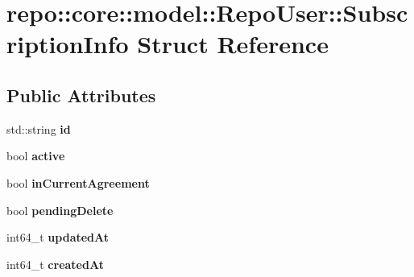 \hypertarget{structrepo_1_1core_1_1model_1_1_repo_user_1_1_subscription_info}{}\section{repo\+:\+:core\+:\+:model\+:\+:Repo\+User\+:\+:Subscription\+Info Struct Reference}
\label{structrepo_1_1core_1_1model_1_1_repo_user_1_1_subscription_info}
\subsection*{Public Attributes}
\begin{DoxyCompactItemize}
\item 
\hypertarget{structrepo_1_1core_1_1model_1_1_repo_user_1_1_subscription_info_a9c004e0129afaf4b430622a0ca362230}{}std\+::string {\bfseries id}\label{structrepo_1_1core_1_1model_1_1_repo_user_1_1_subscription_info_a9c004e0129afaf4b430622a0ca362230}

\item 
\hypertarget{structrepo_1_1core_1_1model_1_1_repo_user_1_1_subscription_info_abd21c4a0164ef988a233548b6a8c3863}{}bool {\bfseries active}\label{structrepo_1_1core_1_1model_1_1_repo_user_1_1_subscription_info_abd21c4a0164ef988a233548b6a8c3863}

\item 
\hypertarget{structrepo_1_1core_1_1model_1_1_repo_user_1_1_subscription_info_aa7014158440b6a165814df5f3396c4bc}{}bool {\bfseries in\+Current\+Agreement}\label{structrepo_1_1core_1_1model_1_1_repo_user_1_1_subscription_info_aa7014158440b6a165814df5f3396c4bc}

\item 
\hypertarget{structrepo_1_1core_1_1model_1_1_repo_user_1_1_subscription_info_af1e5442205eca8a48badadd0a38b07ce}{}bool {\bfseries pending\+Delete}\label{structrepo_1_1core_1_1model_1_1_repo_user_1_1_subscription_info_af1e5442205eca8a48badadd0a38b07ce}

\item 
\hypertarget{structrepo_1_1core_1_1model_1_1_repo_user_1_1_subscription_info_a52e45300c42a5bb160203565ad8462a7}{}int64\+\_\+t {\bfseries updated\+At}\label{structrepo_1_1core_1_1model_1_1_repo_user_1_1_subscription_info_a52e45300c42a5bb160203565ad8462a7}

\item 
\hypertarget{structrepo_1_1core_1_1model_1_1_repo_user_1_1_subscription_info_a45e79dff08fb29cadbd52efc46daa491}{}int64\+\_\+t {\bfseries created\+At}\label{structrepo_1_1core_1_1model_1_1_repo_user_1_1_subscription_info_a45e79dff08fb29cadbd52efc46daa491}


\end{DoxyCompactItemize}
